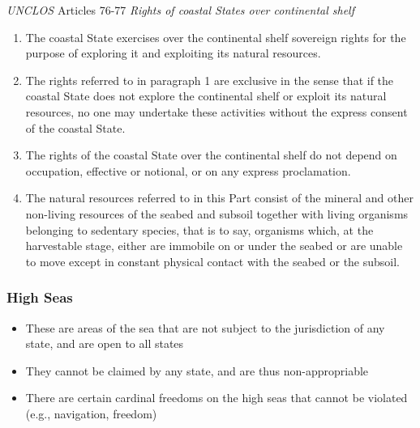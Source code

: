 \begin{conventiondetails}{\textit{UNCLOS} Articles 76-77}
    \textit{Rights of coastal States over continental shelf}

    \begin{enumerate}
        \item The coastal State exercises over the continental shelf sovereign rights for the purpose of exploring it and exploiting its natural resources.
        \item The rights referred to in paragraph 1 are exclusive in the sense that if the coastal State does not explore the continental shelf or exploit its natural resources, no one may undertake these activities without the express consent of the coastal State.
        \item The rights of the coastal State over the continental shelf do not depend on occupation, effective or notional, or on any express proclamation.
        \item The natural resources referred to in this Part consist of the mineral and other non-living resources of the seabed and subsoil together with living organisms belonging to sedentary species, that is to say, organisms which, at the harvestable stage, either are immobile on or under the seabed or are unable to move except in constant physical contact with the seabed or the subsoil.
    \end{enumerate}
\end{conventiondetails}

\subsubsection{High Seas}
\begin{itemize}
    \item These are areas of the sea that are not subject to the jurisdiction of any state, and are open to all states
    \item They cannot be claimed by any state, and are thus non-appropriable
    \item There are certain cardinal freedoms on the high seas that cannot be violated (e.g., navigation, freedom)
\end{itemize}

